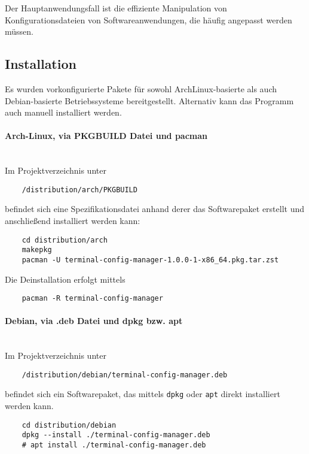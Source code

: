\documentclass[a4paper,11pt]{scrartcl} %
\begin{document}
Der Hauptanwendungsfall ist die effiziente  Manipulation von
Konfigurationsdateien von Softwareanwendungen, die häufig angepasst
werden müssen.

\subsection{Installation}
Es wurden vorkonfigurierte Pakete für sowohl ArchLinux-basierte als auch
Debian-basierte Betriebssysteme bereitgestellt. Alternativ
kann das Programm auch manuell installiert werden.

\paragraph{Arch-Linux, via PKGBUILD Datei und pacman}\mbox{}\\
Im Projektverzeichnis unter

\begin{verbatim}
	/distribution/arch/PKGBUILD
\end{verbatim}

befindet sich eine Spezifikationsdatei anhand derer das Softwarepaket
erstellt und anschließend installiert werden kann:

\begin{verbatim}
	cd distribution/arch
	makepkg
	pacman -U terminal-config-manager-1.0.0-1-x86_64.pkg.tar.zst
\end{verbatim}

Die Deinstallation erfolgt mittels

\begin{verbatim}
	pacman -R terminal-config-manager
\end{verbatim}

\paragraph{Debian, via .deb Datei und dpkg bzw. apt}\mbox{}\\
Im Projektverzeichnis unter

\begin{verbatim}
	/distribution/debian/terminal-config-manager.deb
\end{verbatim}

befindet sich ein Softwarepaket, das mittels \texttt{dpkg} oder
\texttt{apt} direkt installiert werden kann.

\begin{verbatim}
	cd distribution/debian
	dpkg --install ./terminal-config-manager.deb
	# apt install ./terminal-config-manager.deb
\end{verbatim}
\end{document}
